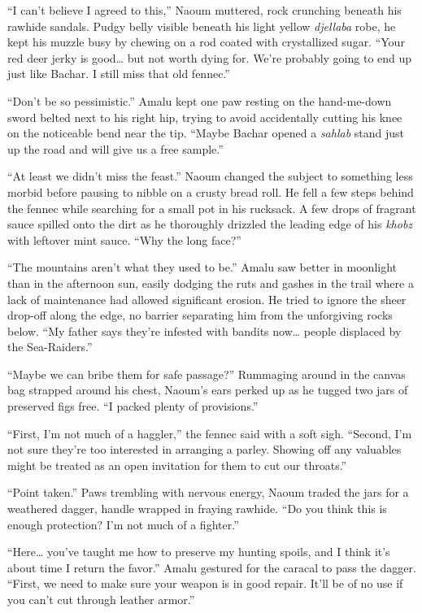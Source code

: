 ``I can't believe I agreed to this,'' Naoum muttered, rock crunching beneath his rawhide sandals. Pudgy belly visible beneath his light yellow \emph{djellaba} robe, he kept his muzzle busy by chewing on a rod coated with crystallized sugar. ``Your red deer jerky is good\ldots{} but not worth dying for. We're probably going to end up just like Bachar. I still miss that old fennec.''

``Don't be so pessimistic.'' Amalu kept one paw resting on the hand-me-down sword belted next to his right hip, trying to avoid accidentally cutting his knee on the noticeable bend near the tip. ``Maybe Bachar opened a \emph{sahlab} stand just up the road and will give us a free sample.''

``At least we didn't miss the feast.'' Naoum changed the subject to something less morbid before pausing to nibble on a crusty bread roll. He fell a few steps behind the fennec while searching for a small pot in his rucksack. A few drops of fragrant sauce spilled onto the dirt as he thoroughly drizzled the leading edge of his \emph{khobz} with leftover mint sauce. ``Why the long face?''

``The mountains aren't what they used to be.'' Amalu saw better in moonlight than in the afternoon sun, easily dodging the ruts and gashes in the trail where a lack of maintenance had allowed significant erosion. He tried to ignore the sheer drop-off along the edge, no barrier separating him from the unforgiving rocks below. ``My father says they're infested with bandits now\ldots{} people displaced by the Sea-Raiders.''

``Maybe we can bribe them for safe passage?'' Rummaging around in the canvas bag strapped around his chest, Naoum's ears perked up as he tugged two jars of preserved figs free. ``I packed plenty of provisions.''

``First, I'm not much of a haggler,'' the fennec said with a soft sigh. ``Second, I'm not sure they're too interested in arranging a parley. Showing off any valuables might be treated as an open invitation for them to cut our throats.''

``Point taken.'' Paws trembling with nervous energy, Naoum traded the jars for a weathered dagger, handle wrapped in fraying rawhide. ``Do you think this is enough protection? I'm not much of a fighter.''

``Here\ldots{} you've taught me how to preserve my hunting spoils, and I think it's about time I return the favor.'' Amalu gestured for the caracal to pass the dagger. ``First, we need to make sure your weapon is in good repair. It'll be of no use if you can't cut through leather armor.''

